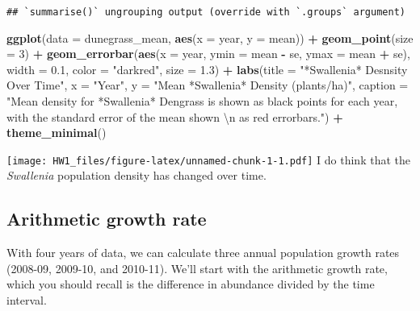 \documentclass[
]{article}
\newenvironment{Shaded}{\begin{snugshade}}{\end{snugshade}}
\newcommand{\CharTok}[1]{\textcolor[rgb]{0.31,0.60,0.02}{#1}}
\newcommand{\DataTypeTok}[1]{\textcolor[rgb]{0.13,0.29,0.53}{#1}}
\newcommand{\DecValTok}[1]{\textcolor[rgb]{0.00,0.00,0.81}{#1}}
\newcommand{\FloatTok}[1]{\textcolor[rgb]{0.00,0.00,0.81}{#1}}
\newcommand{\KeywordTok}[1]{\textcolor[rgb]{0.13,0.29,0.53}{\textbf{#1}}}
\newcommand{\NormalTok}[1]{#1}
\newcommand{\OperatorTok}[1]{\textcolor[rgb]{0.81,0.36,0.00}{\textbf{#1}}}
\newcommand{\StringTok}[1]{\textcolor[rgb]{0.31,0.60,0.02}{#1}}
\begin{document}
\begin{verbatim}
## `summarise()` ungrouping output (override with `.groups` argument)
\end{verbatim}

\begin{Shaded}
\begin{Highlighting}[]
\KeywordTok{ggplot}\NormalTok{(}\DataTypeTok{data =}\NormalTok{ dunegrass_mean, }\KeywordTok{aes}\NormalTok{(}\DataTypeTok{x =}\NormalTok{ year, }\DataTypeTok{y =}\NormalTok{ mean)) }\OperatorTok{+}
\StringTok{         }\KeywordTok{geom_point}\NormalTok{(}\DataTypeTok{size =} \DecValTok{3}\NormalTok{) }\OperatorTok{+}\StringTok{ }
\StringTok{ }\KeywordTok{geom_errorbar}\NormalTok{(}\KeywordTok{aes}\NormalTok{(}\DataTypeTok{x =}\NormalTok{ year, }\DataTypeTok{ymin =}\NormalTok{ mean }\OperatorTok{-}\StringTok{ }\NormalTok{se, }\DataTypeTok{ymax =}\NormalTok{ mean }\OperatorTok{+}\StringTok{ }\NormalTok{se), }\DataTypeTok{width =} \FloatTok{0.1}\NormalTok{, }\DataTypeTok{color =} \StringTok{"darkred"}\NormalTok{, }\DataTypeTok{size =} \FloatTok{1.3}\NormalTok{) }\OperatorTok{+}
\StringTok{ }\KeywordTok{labs}\NormalTok{(}\DataTypeTok{title =} \StringTok{"*Swallenia* Desnsity Over Time"}\NormalTok{, }\DataTypeTok{x =} \StringTok{"Year"}\NormalTok{, }\DataTypeTok{y =} \StringTok{"Mean *Swallenia* Density (plants/ha)"}\NormalTok{, }\DataTypeTok{caption =} \StringTok{"Mean density for *Swallenia* Dengrass is shown as black points for each year, with the standard error of the mean shown }\CharTok{\textbackslash{}n}\StringTok{ as red errorbars."}\NormalTok{) }\OperatorTok{+}
\StringTok{  }\KeywordTok{theme_minimal}\NormalTok{()}
\end{Highlighting}
\end{Shaded}

\texttt{[image: HW1\_files/figure-latex/unnamed-chunk-1-1.pdf]} I do
think that the \emph{Swallenia} population density has changed over
time.

\hypertarget{arithmetic-growth-rate}{%
\subsection{Arithmetic growth rate}\label{arithmetic-growth-rate}}

With four years of data, we can calculate three annual population growth
rates (2008-09, 2009-10, and 2010-11). We'll start with the arithmetic
growth rate, which you should recall is the difference in abundance
divided by the time interval.
\end{document}
